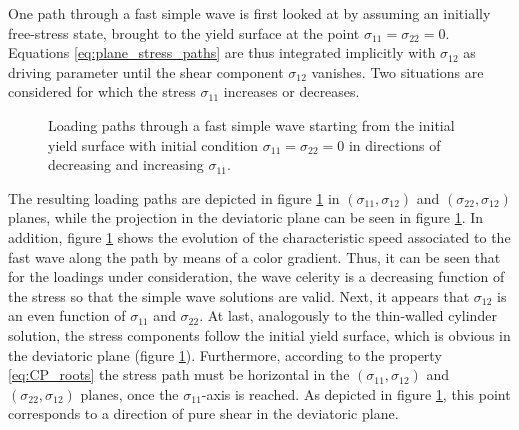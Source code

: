 One path through a fast simple wave is first looked at by assuming an initially free-stress state, brought to the yield surface at the point $ \sigma_{11}=\sigma_{22}=0 $.
Equations \eqref{eq:plane_stress_paths} are thus integrated implicitly with $\sigma_{12}$ as driving parameter until the shear component $\sigma_{12}$ vanishes.
Two situations are considered for which the stress $\sigma_{11}$ increases or decreases.
\begin{figure}[h!]
  \centering
  \caption{Loading paths through a fast simple wave starting from the initial yield surface with initial condition $\sigma_{11}=\sigma_{22}=0 $ in directions of decreasing and increasing $\sigma_{11} $.}
  \label{fig:fast_path_plane_stress}
\end{figure}
The resulting loading paths are depicted in figure \ref{fig:fast_path_plane_stress} in $(\sigma_{11},\sigma_{12})$ and $(\sigma_{22},\sigma_{12})$ planes, while the projection in the deviatoric plane can be seen in figure \ref{fig:fast_path_plane_stress}.
In addition, figure \ref{fig:fast_path_plane_stress} shows the evolution of the characteristic speed associated to the fast wave along the path by means of a color gradient.
Thus, it can be seen that for the loadings under consideration, the wave celerity is a decreasing function of the stress so that the simple wave solutions are valid.
Next, it appears that $\sigma_{12}$ is an even function of $\sigma_{11}$ and $\sigma_{22}$. %
At last, analogously to the thin-walled cylinder solution, the stress components follow the initial yield surface, which is obvious in the deviatoric plane (figure \ref{fig:fast_path_plane_stress}).
Furthermore, according to the property \eqref{eq:CP_roots} the stress path must be horizontal in the $(\sigma_{11},\sigma_{12})$ and $(\sigma_{22},\sigma_{12})$ planes, once the $\sigma_{11}$-axis is reached.
As depicted in figure \ref{fig:fast_path_plane_stress}, this point corresponds to a direction of pure shear in the deviatoric plane.
